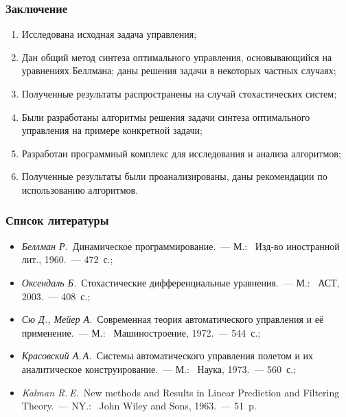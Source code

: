 \documentclass[ignorenonframetext,hyperref={pdftex,unicode,pdfpagelabels=false},compress]{beamer}
\begin{document}
\begin{frame}
    \frametitle{Заключение}

    \begin{enumerate}
        \item
            Исследована исходная задача управления;

        \item
            Дан общий метод синтеза оптимального управления, основывающийся на уравнениях Беллмана; даны решения задачи в некоторых частных случаях;

        \item
            Полученные результаты распространены на случай стохастических систем;

        \item
            Были разработаны алгоритмы решения задачи синтеза оптимального управления на примере конкретной задачи;

        \item
            Разработан программный комплекс для исследования и анализа алгоритмов;

        \item
            Полученные результаты были проанализированы, даны рекомендации по использованию алгоритмов.
    \end{enumerate}
\end{frame}


\begin{frame}
    \frametitle{Список литературы}
    
    \begin{itemize}
        \item
            \emph{Беллман Р.}~Динамическое программирование.~--- М.:~ Изд-во иностранной лит., 1960.~--- 472~с.;

        \item
            \emph{Оксендаль Б.}~Стохастические дифференциальные уравнения.~--- М.:~ АСТ, 2003.~--- 408~с.;

        \item
            \emph{Сю Д., Мейер А.}~Современная теория автоматического управления и её применение.~--- М.:~ Машиностроение, 1972.~--- 544~с.;

        \item
            \emph{Красовский А.\,А.}~Системы автоматического управления полетом и их аналитическое конструирование.~--- М.:~ Наука, 1973.~--- 560~с.;

        \item
            \emph{Kalman R.\,E.}~New methods and Results in Linear Prediction and Filtering Theory.~--- NY.:~ John Wiley and Sons, 1963.~--- 51~p.
    \end{itemize}
\end{frame}
\end{document}
